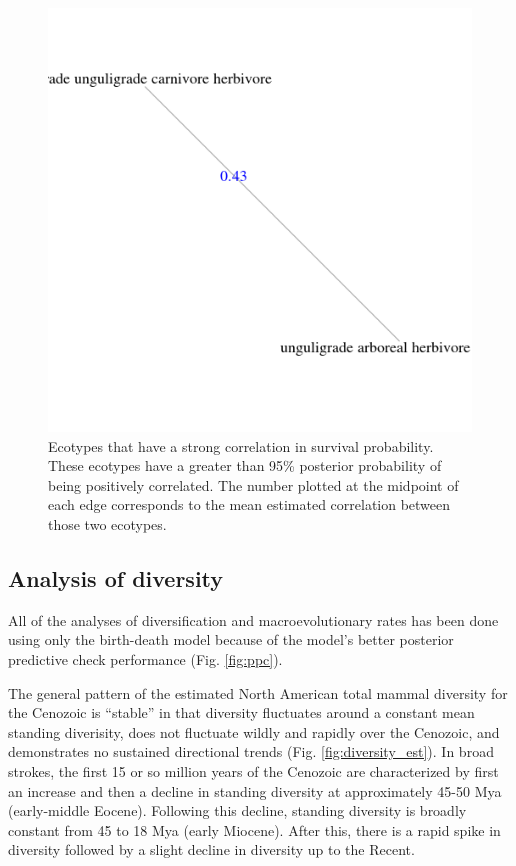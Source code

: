 \documentclass[12pt,letterpaper]{article}
\begin{document}
\begin{figure}[ht]
  \centering
  \includegraphics[width=\textwidth,height=0.4\textheight,keepaspectratio=true]{figure/surv_sig_corr}
  \caption[Ecotypes with strong correlations in survival probability]{Ecotypes that have a strong correlation in survival probability. These ecotypes have a greater than 95\% posterior probability of being positively correlated. The number plotted at the midpoint of each edge corresponds to the mean estimated correlation between those two ecotypes.}
  \label{fig:surv_corr_graph}
\end{figure}










\subsection*{Analysis of diversity}

All of the analyses of diversification and macroevolutionary rates has been done using only the birth-death model because of the model's better posterior predictive check performance (Fig. \ref{fig:ppc}).


The general pattern of the estimated North American total mammal diversity for the Cenozoic is ``stable'' in that diversity fluctuates around a constant mean standing diverisity, does not fluctuate wildly and rapidly over the Cenozoic, and demonstrates no sustained directional trends (Fig. \ref{fig:diversity_est}). In broad strokes, the first 15 or so million years of the Cenozoic are characterized by first an increase and then a decline in standing diversity at approximately 45-50 Mya (early-middle Eocene). Following this decline, standing diversity is broadly constant from 45 to 18 Mya (early Miocene). After this, there is a rapid spike in diversity followed by a slight decline in diversity up to the Recent. 
\end{document}
